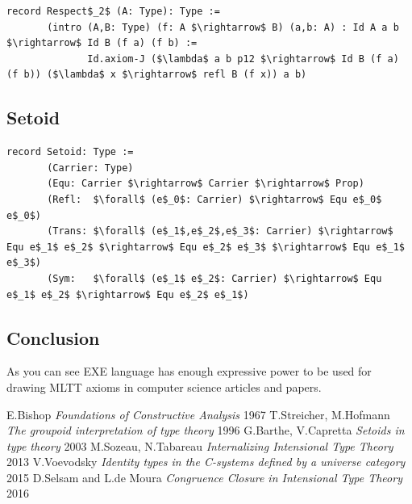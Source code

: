 \documentclass[11pt,oneside]{article}
\begin{document}
\begin{lstlisting}[mathescape=true]
record Respect$_2$ (A: Type): Type :=
       (intro (A,B: Type) (f: A $\rightarrow$ B) (a,b: A) : Id A a b $\rightarrow$ Id B (f a) (f b) :=
              Id.axiom-J ($\lambda$ a b p12 $\rightarrow$ Id B (f a) (f b)) ($\lambda$ x $\rightarrow$ refl B (f x)) a b)
\end{lstlisting}

\subsection{Setoid}

\begin{lstlisting}[mathescape=true]
record Setoid: Type :=
       (Carrier: Type)
       (Equ: Carrier $\rightarrow$ Carrier $\rightarrow$ Prop)
       (Refl:  $\forall$ (e$_0$: Carrier) $\rightarrow$ Equ e$_0$ e$_0$)
       (Trans: $\forall$ (e$_1$,e$_2$,e$_3$: Carrier) $\rightarrow$ Equ e$_1$ e$_2$ $\rightarrow$ Equ e$_2$ e$_3$ $\rightarrow$ Equ e$_1$ e$_3$)
       (Sym:   $\forall$ (e$_1$ e$_2$: Carrier) $\rightarrow$ Equ e$_1$ e$_2$ $\rightarrow$ Equ e$_2$ e$_1$)
\end{lstlisting}

\subsection{Conclusion}
As you can see EXE language has enough expressive power to be used for
drawing MLTT axioms in computer science articles and papers.

\newpage
\begin{thebibliography}{9}

 E.Bishop \textit{Foundations of Constructive Analysis} 1967
 T.Streicher, M.Hofmann  \textit{The groupoid interpretation of type theory} 1996
 G.Barthe, V.Capretta \textit{Setoids in type theory} 2003
 M.Sozeau, N.Tabareau \textit{Internalizing Intensional Type Theory} 2013
 V.Voevodsky \textit{Identity types in the C-systems defined by a universe category} 2015
 D.Selsam and L.de Moura \textit{Congruence Closure in Intensional Type Theory} 2016
\end{thebibliography}
\end{document}

